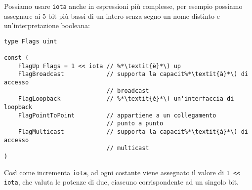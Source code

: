 Possiamo usare \verb|iota| anche in espressioni più complesse, per esempio possiamo assegnare ai 5 bit più bassi di un intero senza segno un nome distinto e un'interpretazione booleana:
\begin{lstlisting}[frame = single, label = {lst:lstlisting2-3-1.2}]
type Flags uint

const (
    FlagUp Flags = 1 << iota // %*\textit{è}*\) up
    FlagBroadcast            // supporta la capacit%*\textit{à}*\) di accesso
                             // broadcast
    FlagLoopback             // %*\textit{è}*\) un'interfaccia di loopback
    FlagPointToPoint         // appartiene a un collegamento
                             // punto a punto
    FlagMulticast            // supporta la capacit%*\textit{à}*\) di accesso
                             // multicast
)
\end{lstlisting}
Così come incrementa \verb|iota|, ad ogni costante viene assegnato il valore di \verb|1 << iota|, che valuta le potenze di due, ciascuno corrispondente ad un singolo bit.
